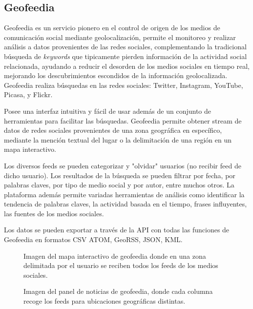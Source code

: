 \subsection{Geofeedia}

Geofeedia \cite{geofeedia} es un servicio pionero en el control de origen de los medios de comunicación social mediante geolocalización, permite el monitoreo y  realizar análisis a datos provenientes de las redes sociales, complementando la tradicional búsqueda de \emph{keywords} que tipicamente pierden información de la actividad social relacionada, ayudando a reducir el desorden de los medios sociales en tiempo real, mejorando los descubrimientos escondidos de la información geolocalizada. Geofeedia realiza búsquedas en las redes sociales: Twitter, Instagram, YouTube, Picasa, y Flickr.

Posee una interfaz intuitiva y fácil de usar además de un conjunto de herramientas para facilitar las búsquedas. Geofeedia permite obtener stream de datos de redes sociales provenientes de una zona geográfica en específico, mediante la mención textual del lugar o la delimitación de una región en un mapa interactivo.

Los diversos feeds se pueden categorizar y "olvidar" usuarios (no recibir feed de dicho usuario). Los resultados de la búsqueda se pueden filtrar por fecha, por palabras claves, por tipo de medio social y por autor, entre muchos otros. La plataforma además permite variadas herramientas de análisis como identificar la tendencia de palabras claves, la actividad basada en el tiempo, frases influyentes, las fuentes de los medios sociales.

Los datos se pueden exportar a través de la API con todas las funciones de Geofeedia en formatos CSV ATOM, GeoRSS, JSON, KML.

\begin{figure}[H]
	\centering
	\begin{minipage}[t]{.45\textwidth}
		\begin{center}
			  \caption{Imagen del mapa interactivo de geofeedia donde en una zona delimitada por el usuario se reciben todos los feeds de los medios sociales.}
			  \label{fig:geofeedia1}
		\end{center}
	\end{minipage}
	\hfill
	\begin{minipage}[t]{.45\textwidth}
		\begin{center}
			\caption{Imagen del panel de noticias de geofeedia, donde cada columna recoge los feeds para ubicaciones geográficas distintas.}
			\label{fig:geofeedia2}
		\end{center}
	\end{minipage}
	\hfill
\end{figure}


